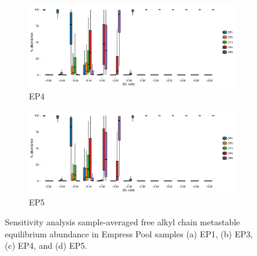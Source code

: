 {\begin{figure}[h]
    \begin{subfigure}[b]{\linewidth}
      	\includegraphics[width=1\linewidth]{"figs_app2/boxplot_ggplot_02bin Empress OF4 iter 999"}
      	\caption{EP4}
        \label{fig:EP4_mc}
    \end{subfigure}
    \begin{subfigure}[b]{\linewidth}
    	\includegraphics[width=1\linewidth]{"figs_app2/boxplot_ggplot_02bin Empress OF5 iter 999"}
    	\caption{EP5}
        \label{fig:EP5_mc}
    \end{subfigure}
    
    \caption[Sensitivity analysis sample-averaged free alkyl chain metastable equilibrium abundance in Empress Pool samples]{Sensitivity analysis sample-averaged free alkyl chain metastable equilibrium abundance in Empress Pool samples (a) EP1, (b) EP3, (c) EP4, and (d) EP5.}
    \label{fig:empress_mc}
\end{figure}
\doublespace
\clearpage
}





